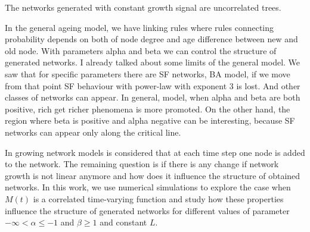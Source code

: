 The networks generated with constant growth signal are uncorrelated trees. 


In the general ageing model, we have linking rules where rules connecting probability depends on both of node degree and age difference between new and old node.  With parameters alpha and beta we can control the structure of generated networks. I already talked about some limits of the general model. We saw that for specific parameters there are SF networks, BA model, if we move from that point SF behaviour with power-law with exponent 3 is lost. And other classes of networks can appear. In general, model, when alpha and beta are both positive, rich get richer phenomena is more promoted. On the other hand, the region where beta is positive and alpha negative can be interesting, because SF networks can appear only along the critical line. 

In growing network models is considered that at each time step one node is added to the network. The remaining question is if there is any change if network growth is not linear anymore and how does it influence the structure of obtained networks.  In this work, we use numerical simulations to explore the case when $M(t)$ is a correlated time-varying function and study how these properties influence the structure of generated networks for different values of parameter $-\infty<\alpha\leq-1$ and $\beta\geq1$ and constant $L$.












